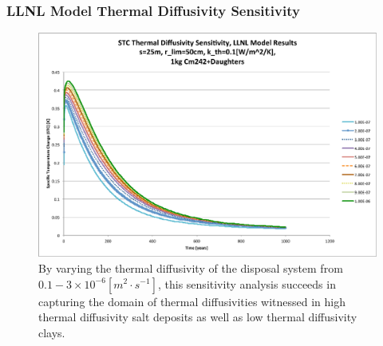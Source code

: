 
\begin{frame}[ctb!]
\frametitle{LLNL Model Thermal Diffusivity Sensitivity}
\footnotesize{

\begin{figure}[htbp!]
\begin{center}
\includegraphics[height=0.7\textheight]{./thermal_demonstration/diffusivity/Cm242alpha_kth_low.eps}
\end{center}
\caption[$K_{th}$ Sensitivity to $\alpha_{th}$ for $k_{th}$]{
By varying the thermal diffusivity of the disposal system from $0.1-3\times 
10^{-6} [m^2\cdot s^{-1}]$, this sensitivity analysis succeeds in capturing the domain of 
thermal diffusivities witnessed in high thermal diffusivity salt deposits as 
well as low thermal diffusivity clays.}
\label{fig:Cm242alpha_kth_low}
\end{figure}
}
\end{frame}



